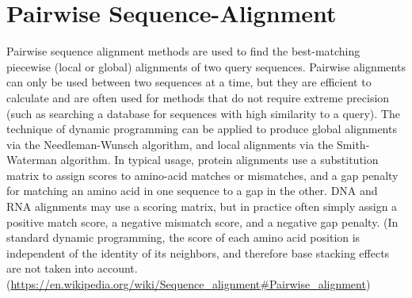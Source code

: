 
\section{Pairwise Sequence-Alignment}
\label{sec:pairwise_alignment}
Pairwise sequence alignment methods are used to find the best-matching piecewise (local or global) alignments of two query sequences.
Pairwise alignments can only be used between two sequences at a time, but they are efficient to calculate and are often used for methods that do not require extreme precision (such as searching a database for sequences with high similarity to a query).
The technique of dynamic programming can be applied to produce global alignments via the Needleman-Wunsch algorithm, and local alignments via the Smith-Waterman algorithm. In typical usage, protein alignments use a substitution matrix to assign scores to amino-acid matches or mismatches, and a gap penalty for matching an amino acid in one sequence to a gap in the other. DNA and RNA alignments may use a scoring matrix, but in practice often simply assign a positive match score, a negative mismatch score, and a negative gap penalty. (In standard dynamic programming, the score of each amino acid position is independent of the identity of its neighbors, and therefore base stacking effects are not taken into account.(\url{https://en.wikipedia.org/wiki/Sequence_alignment#Pairwise_alignment})

